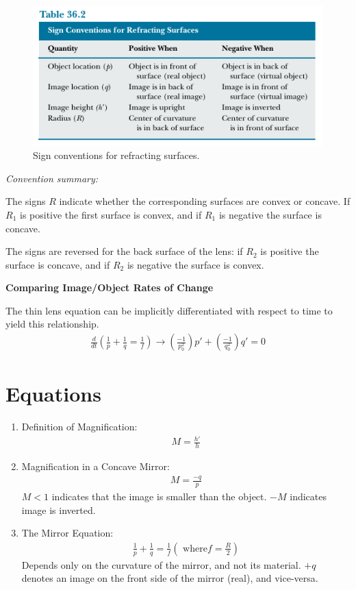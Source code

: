 \documentclass[a4paper,10pt]{report}
\begin{document}
  \begin{figure}[h!]
  \begin{centering}
  \begin{center}
  \includegraphics[width=0.5\linewidth]{./Images/refraction_conventions.png}
  \caption{Sign conventions for refracting surfaces.}
  \label{fig:refraction_conventions}
  \end{center}
  \par\end{centering}
  \end{figure}

  \textit{Convention summary:}

  The signs $R$ indicate whether the corresponding surfaces are convex or concave.
  If $R_1$ is positive the first surface is convex, and if $R_1$ is negative the surface is concave.

  The signs are reversed for the back surface of the lens: if $R_2$ is positive the surface is concave, and if $R_2$ is negative the surface is convex.

  \textbf{Comparing Image/Object Rates of Change}

  The thin lens equation can be implicitly differentiated with respect to time to yield this relationship.
  \begin{align*}
   \frac{d}{dt}\left(\frac{1}{p} + \frac{1}{q} = \frac{1}{f}\right) \rightarrow \left(\frac{-1}{p_0^2}\right)p' + \left(\frac{-1}{q_0^2}\right)q' = 0
  \end{align*}



\section{Equations}
\begin{enumerate}
  \item
  Definition of Magnification:
  \begin{align*}
   M = \frac{h'}{h}
  \end{align*}

  \item
  Magnification in a Concave Mirror:
  \begin{align*}
   M = \frac{-q}{p}
  \end{align*}
  $M<1$ indicates that the image is smaller than the object. $-M$ indicates image is inverted.

  \item
  The Mirror Equation:
  \begin{align*}
   \frac{1}{p} + \frac{1}{q} = \frac{1}{f} (\text{ where} f = \frac{R}{2})
  \end{align*}
  Depends only on the curvature of the mirror, and not its material.
  $+q$ denotes an image on the front side of the mirror (real), and vice-versa.
  \end{enumerate}
\end{document}
